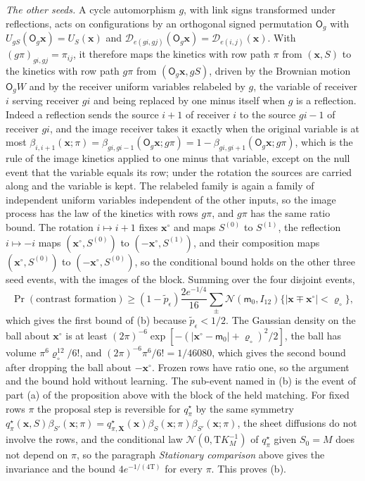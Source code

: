 \emph{The other seeds.} A cycle automorphism \(g\), with link signs transformed
under reflections, acts on configurations by an orthogonal signed permutation
\(\mathsf O_g\) with \(U_{gS}(\mathsf O_g\mathbf x)=U_S(\mathbf x)\) and
\(\mathcal D_{e(gi,gj)}(\mathsf O_g\mathbf x)=\mathcal D_{e(i,j)}(\mathbf x)\).
With \((g\pi)_{gi,gj}=\pi_{ij}\), it therefore maps the kinetics with row path
\(\pi\) from \((\mathbf x,S)\) to the kinetics with row path \(g\pi\) from
\((\mathsf O_g\mathbf x,gS)\), driven by the Brownian motion \(\mathsf O_gW\)
and by the receiver uniform variables relabeled by \(g\), the variable of
receiver \(i\) serving receiver \(gi\) and being replaced by one minus itself
when \(g\) is a reflection. Indeed a reflection sends the source \(i+1\) of
receiver \(i\) to the source \(gi-1\) of receiver \(gi\), and the image
receiver takes it exactly when the original variable is at most
\(\beta_{i,i+1}(\mathbf x;\pi)=\beta_{gi,gi-1}(\mathsf O_g\mathbf x;g\pi)
=1-\beta_{gi,gi+1}(\mathsf O_g\mathbf x;g\pi)\), which is the rule of the
image kinetics applied to one minus that variable, except on the null event
that the variable equals its row; under the rotation the sources are carried
along and the variable is kept. The relabeled family is again a family of
independent uniform variables independent of the other inputs, so the image
process has the law of the kinetics with rows \(g\pi\), and \(g\pi\) has the
same ratio bound. The rotation \(i\mapsto i+1\) fixes
\(\mathbf x^\circ\) and maps \(S^{(0)}\) to \(S^{(1)}\), the reflection
\(i\mapsto-i\) maps \((\mathbf x^\circ,S^{(0)})\) to
\((-\mathbf x^\circ,S^{(1)})\), and their composition maps
\((\mathbf x^\circ,S^{(0)})\) to \((-\mathbf x^\circ,S^{(0)})\), so the
conditional bound holds on the other three seed events, with the images of the
block. Summing over the four disjoint
events,
\[
\Pr(\text{contrast formation})\ge(1-\tilde p_\epsilon)\frac{2e^{-1/4}}{16}
\sum_\pm\mathcal N(\mathsf m_0,I_{12})
\bigl\{|\mathbf x\mp\mathbf x^\circ|<\varrho_\circ\bigr\},
\]
which gives the first bound of (b) because \(\tilde p_\epsilon<1/2\). The
Gaussian density on the ball about \(\mathbf x^\circ\) is at least
\((2\pi)^{-6}\exp[-(|\mathbf x^\circ-\mathsf m_0|+\varrho_\circ)^2/2]\), the ball
has volume \(\pi^6\varrho_\circ^{12}/6!\), and \((2\pi)^{-6}\pi^6/6!=1/46080\),
which gives the second bound after dropping the ball about
\(-\mathbf x^\circ\). Frozen rows have ratio one, so the argument and the bound
hold without learning. The sub-event named in (b) is the event of part (a) of
the proposition above with the block of the held matching. For fixed rows
\(\pi\) the proposal step is reversible for \(q^\star_\pi\) by the same
symmetry \(q^\star_\pi(\mathbf x,S)\beta_{S'}(\mathbf x;\pi)
=q^\star_{\pi,\mathbf X}(\mathbf x)\beta_S(\mathbf x;\pi)\beta_{S'}(\mathbf x;\pi)\),
the sheet diffusions do not involve the rows, and the conditional law
\(\mathcal N(0,\mathrm TK_M^{-1})\) of \(q^\star_\pi\) given \(S_0=M\) does not
depend on \(\pi\), so the paragraph \emph{Stationary comparison} above gives
the invariance and the bound \(4e^{-1/(4\mathrm T)}\) for every \(\pi\). This
proves (b).

